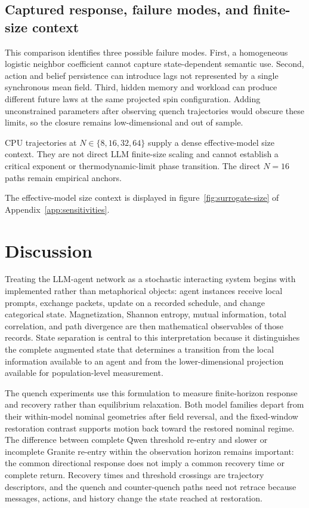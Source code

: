 \documentclass[12pt]{article}
\begin{document}
\subsection{Captured response, failure modes, and finite-size context}
\label{sec:closure-limits}

This comparison identifies three possible failure modes.  First, a homogeneous
logistic neighbor coefficient cannot capture state-dependent semantic use.
Second, action and belief persistence can introduce lags not represented by a
single synchronous mean field.  Third, hidden memory and workload can produce
different future laws at the same projected spin configuration.  Adding
unconstrained parameters after observing quench trajectories would obscure
these limits, so the closure remains low-dimensional and out of sample.

CPU trajectories at $N\in\{8,16,32,64\}$ supply a dense effective-model size
context.  They are not direct LLM finite-size scaling and cannot establish a
critical exponent or thermodynamic-limit phase transition.  The direct
$N=16$ paths remain empirical anchors.

The effective-model size context is displayed in figure~\ref{fig:surrogate-size}
of Appendix~\ref{app:sensitivities}.

\section{Discussion}
\label{sec:discussion}

Treating the LLM-agent network as a stochastic interacting system begins with
implemented rather than metaphorical objects: agent instances receive local
prompts, exchange packets, update on a recorded schedule, and change
categorical state.  Magnetization, Shannon entropy, mutual information, total
correlation, and path divergence are then mathematical observables of those
records.  State separation is central to this interpretation because it
distinguishes the complete augmented state that determines a transition from
the local information available to an agent and from the lower-dimensional
projection available for population-level measurement.

The quench experiments use this formulation to measure finite-horizon response
and recovery rather than equilibrium relaxation.  Both model families depart
from their within-model nominal geometries after field reversal, and the
fixed-window restoration contrast supports motion back toward the restored
nominal regime.  The difference between complete Qwen threshold re-entry and
slower or incomplete Granite re-entry within the observation horizon remains
important: the common directional response does not imply a common recovery
time or complete return.  Recovery times and threshold crossings are
trajectory descriptors, and the quench and counter-quench paths need not
retrace because messages, actions, and history change the state reached at
restoration.
\end{document}
